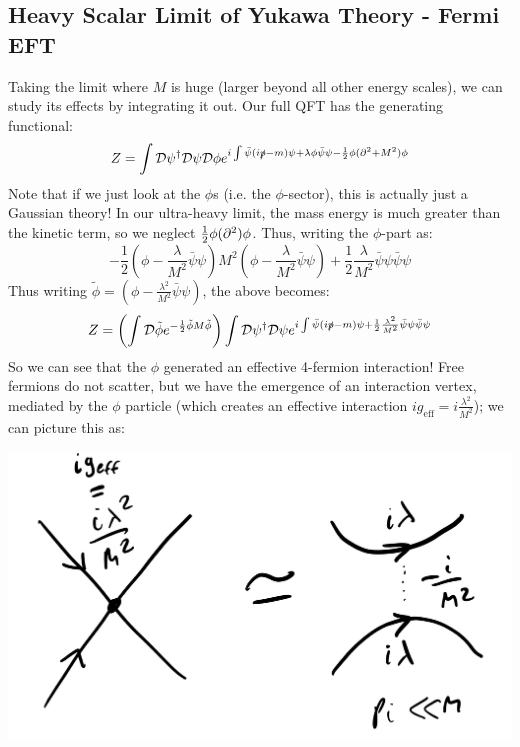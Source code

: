 \subsection{Heavy Scalar Limit of Yukawa Theory - Fermi EFT}
Taking the limit where $M$ is huge (larger beyond all other energy scales), we can study its effects by integrating it out. Our full QFT has the generating functional:
\begin{equation}
    Z = \int \mathcal{D}\psi^\dag \mathcal{D}\psi \mathcal{D}\phi e^{i\int \bar{\psi}(i\slashed{p} - m)\psi + \lambda \phi \bar{\psi}\psi - \frac{1}{2}\phi(\p^2 + M^2)\phi}
\end{equation}
Note that if we just look at the $\phi$s (i.e. the $\phi$-sector), this is actually just a Gaussian theory! In our ultra-heavy limit, the mass energy is much greater than the kinetic term, so we neglect $\frac{1}{2}\phi(\p^2)\phi$. Thus, writing the $\phi$-part as:
\begin{equation}
    -\frac{1}{2}(\phi - \frac{\lambda}{M^2}\bar{\psi}\psi)M^2\left(\phi - \frac{\lambda}{M^2}\bar{\psi}\psi\right) + \frac{1}{2}\frac{\lambda}{M^2}\bar{\psi}\psi \bar{\psi}\psi
\end{equation}
Thus writing $\tilde{\phi} = (\phi - \frac{\lambda^2}{M^2}\bar{\psi}\psi)$, the above becomes:
\begin{equation}
    Z = \left(\int \mathcal{D}\tilde{\phi} e^{-\frac{1}{2}\tilde{\phi}M\tilde{\phi}}\right)\int \mathcal{D}\psi^\dag \mathcal{D}\psi e^{i\int \bar{\psi}(i\slashed{p} - m)\psi + \frac{1}{2}\frac{\lambda^2}{M^2}\bar{\psi}\psi\bar{\psi}\psi}
\end{equation}
So we can see that the $\phi$ generated an effective 4-fermion interaction! Free fermions do not scatter, but we have the emergence of an interaction vertex, mediated by the $\phi$ particle (which creates an effective interaction $ig_{\text{eff}} = i\frac{\lambda^2}{M^2}$); we can picture this as:

\begin{center}
    \includegraphics[scale=0.3]{Lectures/Images/lec6-effectiveinteraction.png}
\end{center}

